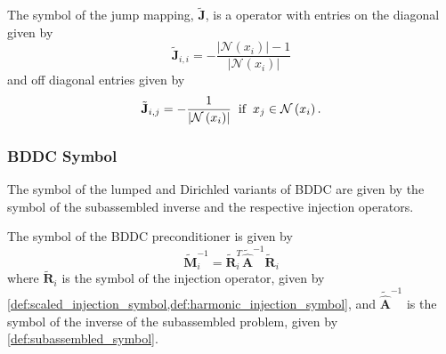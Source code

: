 \documentclass[review]{siamart190516}
\begin{document}
\begin{definition}
The symbol of the jump mapping, $\tilde{\mathbf{J}}$, is a operator with entries on the diagonal given by
\begin{equation}
\tilde{\mathbf{J}}_{i, i} = - \frac{\lvert \mathcal{N} \left( x_i \right) \rvert - 1}{\lvert \mathcal{N} \left( x_i \right) \rvert}
\end{equation}
and off diagonal entries given by
\begin{equation}
\tilde{\mathbf{J}}_{i, j} = - \frac{1}{\lvert \mathcal{N} \left( x_i \right) \rvert} \hspace{2mm} \text{if} \hspace{2mm} x_j \in \mathcal{N} \left( x_i \right).
\end{equation}
\label{def:harmonic_injection_symbol}
\end{definition}

\subsubsection{BDDC Symbol}\label{sec:lfabddcsymbol}

The symbol of the lumped and Dirichled variants of BDDC are given by the symbol of the subassembled inverse and the respective injection operators.

\begin{definition}\label{def:bddc_symbol}
The symbol of the BDDC preconditioner is given by
\begin{equation}
\tilde{\mathbf{M}}^{-1}_i = \tilde{\mathbf{R}}^T_i \tilde{\hat{\mathbf{A}}}^{-1} \tilde{\mathbf{R}}_i
\end{equation}
where $\tilde{\mathbf{R}}_i$ is the symbol of the injection operator, given by \cref{def:scaled_injection_symbol,def:harmonic_injection_symbol}, and $\tilde{\hat{\mathbf{A}}}^{-1}$ is the symbol of the inverse of the subassembled problem, given by \cref{def:subassembled_symbol}.
\end{definition}
\end{document}
